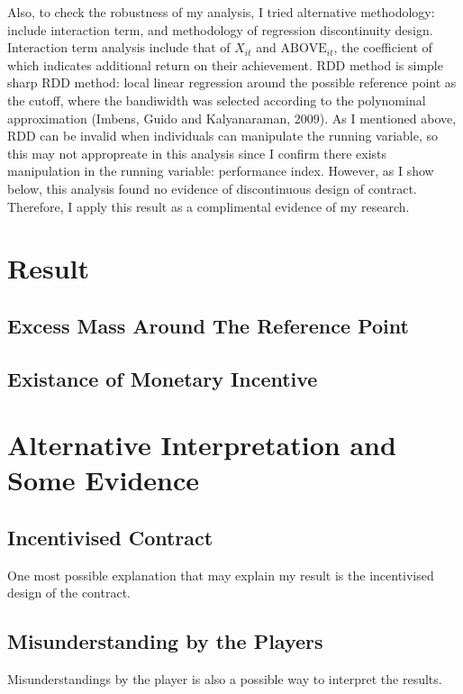 \documentclass[dvipdfmx, 12pt]{article}
\begin{document}
  Also, to check the robustness of my analysis, I tried alternative methodology: include interaction term, and methodology of regression discontinuity design. Interaction term analysis include that of $X_{it}$ and $\text{ABOVE}_{it}$, the coefficient of which indicates additional return on their achievement. RDD method is simple sharp RDD method: local linear regression around the possible reference point as the cutoff, where the bandiwidth was selected according to the polynominal approximation (Imbens, Guido and Kalyanaraman, 2009). As I mentioned above, RDD can be invalid when individuals can manipulate the running variable, so this may not appropreate in this analysis since I confirm there exists manipulation in the running variable: performance index. However, as I show below, this analysis found no evidence of discontinuous design of contract. Therefore, I apply this result as a complimental evidence of my research.

\section{Result}
\subsection{Excess Mass Around The Reference Point}

\subsection{Existance of Monetary Incentive}

\section{Alternative Interpretation and Some Evidence}

\subsection{Incentivised Contract}

One most possible explanation that may explain my result is the incentivised design of the contract.

\subsection{Misunderstanding by the Players}

Misunderstandings by the player is also a possible way to interpret the results.
\end{document}
